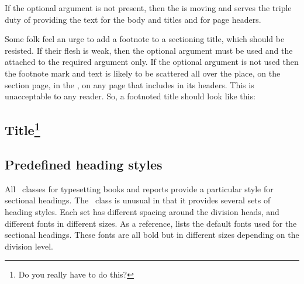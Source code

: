     If the optional argument is not present, then the  is
moving and serves the triple duty of providing the text for the body and \toc{}
titles and for page headers.

    Some folk feel an urge to add a footnote to a sectioning 
title, which
should be resisted. If their flesh is weak, then the optional argument must
be used and the \cmd{\footnote} attached to the required argument only.
If the optional argument is not used then the footnote mark and text is
likely to be scattered all over the place, on the section page, in the \toc,
on any page that includes  in its headers. This is 
unacceptable to any reader. So, a footnoted title should look like
this:
\begin{lcode}
\chapter[Title]{Title\footnote{Do you really have to do this?}}
\end{lcode}



\section{Predefined heading styles}

   All \ltx\ classes for typesetting books and reports provide a particular
style for sectional headings. The \Mname\ class is unusual in that it provides
several sets of heading styles. Each set has different spacing around the
division heads, and different fonts in different sizes. 
    As a reference,  lists the default fonts used
for the sectional headings. These fonts are all bold but in different
sizes depending on the division level.

